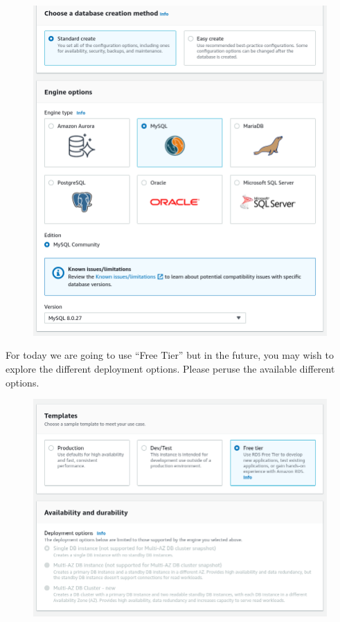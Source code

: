 \documentclass{csse4400}
\begin{document}
\begin{figure}[H]
\includegraphics[width=\textwidth]{images/db1}
\end{figure}

For today we are going to use ``Free Tier'' but in the future,
you may wish to explore the different deployment options.
Please peruse the available different options.


\begin{figure}[H]
  \includegraphics[width=\textwidth]{images/db2}
\end{figure}
\end{document}
